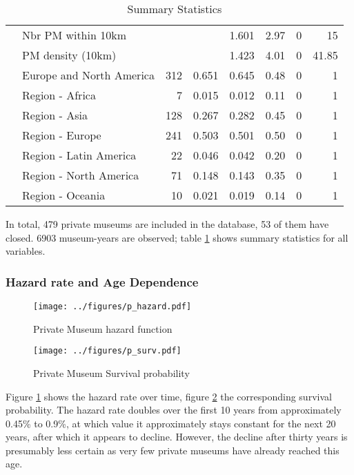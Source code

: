 \documentclass[12pt]{article}
\begin{document}
\begin{table}[ht]
\begin{tabular}{llrrrrrr}
   & Nbr PM within 10km &  &  &   1.601 &   2.97 & 0 & 15 \\ 
   & PM density (10km) &  &  &   1.423 &   4.01 & 0 & 41.85 \\ 
   & Europe and North America & 312 & 0.651 &   0.645 &   0.48 & 0 & 1 \\ 
   & Region - Africa & 7 & 0.015 &   0.012 &   0.11 & 0 & 1 \\ 
   & Region - Asia & 128 & 0.267 &   0.282 &   0.45 & 0 & 1 \\ 
   & Region - Europe & 241 & 0.503 &   0.501 &   0.50 & 0 & 1 \\ 
   & Region - Latin America & 22 & 0.046 &   0.042 &   0.20 & 0 & 1 \\ 
   & Region - North America & 71 & 0.148 &   0.143 &   0.35 & 0 & 1 \\ 
   & Region - Oceania & 10 & 0.021 &   0.019 &   0.14 & 0 & 1 \\ 
   \hline
\end{tabular}
\caption{Summary Statistics} 
\label{tbl:t_sumstats}
\end{table}

In total, 479 private museums are included in the database, 53 of them have closed.
6903 museum-years are observed; table \ref{tbl:t_sumstats} shows summary statistics for all variables.

\subsubsection*{Hazard rate and Age Dependence}


\begin{figure}[htbp]
\centering
\texttt{[image: ../figures/p\_hazard.pdf]}
\caption{\label{fig:p_hazard}Private Museum hazard function}
\end{figure}

\begin{figure}[htbp]
\centering
\texttt{[image: ../figures/p\_surv.pdf]}
\caption{\label{fig:p_surv}Private Museum Survival probability}
\end{figure}


Figure \ref{fig:p_hazard} shows the hazard rate over time, figure \ref{fig:p_surv} the corresponding survival probability.
The hazard rate doubles over the first 10 years from approximately 0.45\% to 0.9\%, at which value it approximately stays constant for the next 20 years, after which it appears to decline.
However, the decline after thirty years is presumably less certain as very few private museums have already reached this age.
\end{document}
